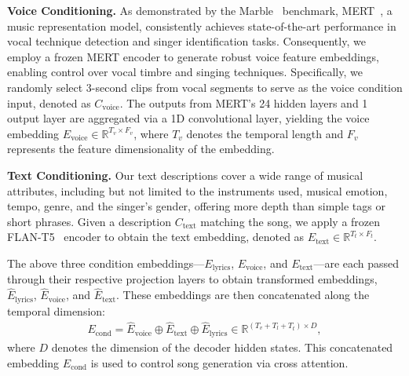 \textbf{Voice Conditioning. }
As demonstrated by the Marble~\cite{yuan2023marble} benchmark, MERT~\cite{li2024mert}, a music representation model, consistently achieves state-of-the-art performance in vocal technique detection and singer identification tasks. Consequently, we employ a frozen MERT encoder to generate robust voice feature embeddings, enabling control over vocal timbre and singing techniques.
Specifically, we randomly select 3-second clips from vocal segments to serve as the voice condition input, denoted as $C_{\text{voice}}$. 
The outputs from MERT's 24 hidden layers and 1 output layer are aggregated via a 1D convolutional layer, yielding the voice embedding $E_{\text{voice}} \in \mathbb{R}^{T_v \times F_v}$, where $T_v$ denotes the temporal length and $F_v$ represents the feature dimensionality of the embedding.


\textbf{Text Conditioning. }
Our text descriptions cover a wide range of musical attributes, including but not limited to the instruments used, musical emotion, tempo, genre, and the singer’s gender, offering more depth than simple tags or short phrases.
Given a description $C_{\text{text}}$  matching the song, we apply a frozen FLAN-T5~\cite{chung2022flanT5} encoder to obtain the text embedding, denoted as $E_{\text{text}} \in \mathbb{R}^{T_t \times F_t}$.

The above three condition embeddings—$E_{\text{lyrics}}$, $ E_{\text{voice}} $, and $ E_{\text{text}} $—are each passed through their respective projection layers to obtain transformed embeddings,  $\hat{E}_{\text{lyrics}} $, $ \hat{E}_{\text{voice}} $, and $\hat{E}_{\text{text}} $. These embeddings are then concatenated along the temporal dimension:
\begin{align}
 E_{\text{cond}} = \hat{E}_{\text{voice}} \oplus  \hat{E}_{\text{text}}  \oplus \hat{E}_{\text{lyrics}} \in \mathbb{R}^{(T_v+T_l+T_t) \times D},   
\end{align}
where $D$ denotes the dimension of the decoder hidden states.
This concatenated embedding \( E_{\text{cond}} \) is used to control song generation via cross attention.


